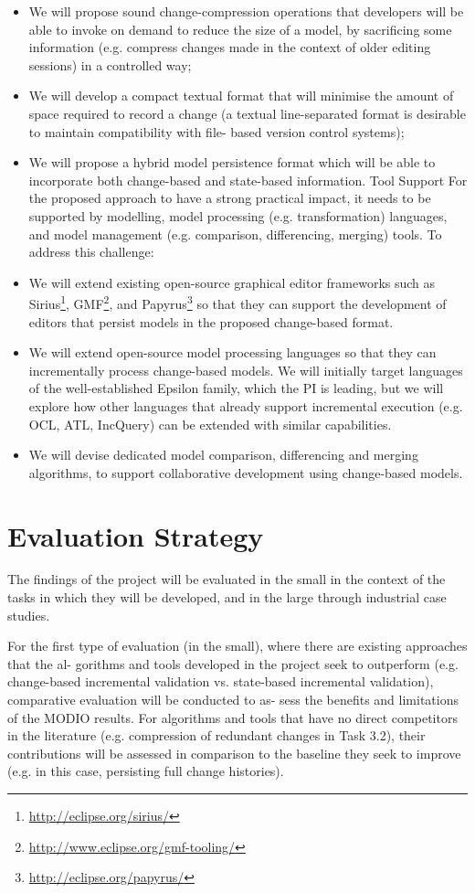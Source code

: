 \documentclass{llncs}
\begin{document}
\begin{itemize}
\item We will propose sound change-compression operations that developers will be able to invoke on
demand to reduce the size of a model, by sacrificing some information (e.g. compress changes
made in the context of older editing sessions) in a controlled way;
\item We will develop a compact textual format that will minimise the amount of space required to
record a change (a textual line-separated format is desirable to maintain compatibility with file-
based version control systems);
\item We will propose a hybrid model persistence format which will be able to incorporate both
change-based and state-based information. Tool Support For the proposed approach to have a strong practical impact, it needs to be supported by modelling, model processing (e.g. transformation) languages, and model management (e.g. comparison, differencing, merging) tools. To address this challenge:
\item We will extend existing open-source graphical editor frameworks such as Sirius\footnote{\url{http://eclipse.org/sirius/}}, GMF\footnote{\url{http://www.eclipse.org/gmf-tooling/}}, and
Papyrus\footnote{\url{http://eclipse.org/papyrus/}} so that they can support the development of editors that persist models in the proposed change-based format.
\item We will extend open-source model processing languages so that they can incrementally process change-based models. We will initially target languages of the well-established Epsilon family, which the PI is leading, but we will explore how other languages that already support incremental execution (e.g. OCL, ATL, IncQuery) can be extended with similar capabilities.
\item We will devise dedicated model comparison, differencing and merging algorithms, to support collaborative development using change-based models.
\end{itemize}

\section{Evaluation Strategy}
The findings of the project will be evaluated in the small in the context of the tasks in which they will
be developed, and in the large through industrial case studies.

For the first type of evaluation (in the small), where there are existing approaches that the al-
gorithms and tools developed in the project seek to outperform (e.g. change-based incremental
validation vs. state-based incremental validation), comparative evaluation will be conducted to as-
sess the benefits and limitations of the MODIO results. For algorithms and tools that have no direct
competitors in the literature (e.g. compression of redundant changes in Task 3.2), their contributions
will be assessed in comparison to the baseline they seek to improve (e.g. in this case, persisting full
change histories).
\end{document}
